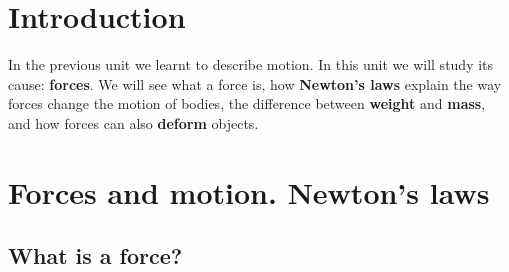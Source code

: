 %
%
%

\raggedbottom %

\section{Introduction}

In the previous unit we learnt to describe motion. In this unit we will study its cause: \textbf{forces}. We will see what a force is, how \textbf{Newton's laws} explain the way forces change the motion of bodies, the difference between \textbf{weight} and \textbf{mass}, and how forces can also \textbf{deform} objects.

\section{Forces and motion. Newton's laws}

\subsection{What is a force?}

